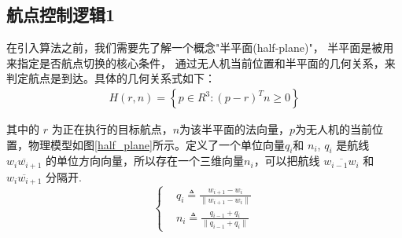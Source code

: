 \subsection{航点控制逻辑1}
在引入算法之前，我们需要先了解一个概念"半平面(half-plane)"，
半平面是被用来指定是否航点切换的核心条件，
通过无人机当前位置和半平面的几何关系，来判定航点是到达。具体的几何关系式如下：
    \begin{equation} %
        \begin{aligned}
            \textit{H}(r,n) = \left\{ p \in R^{3} : \left(p-r\right)^{T}n \geq 0 \right\} 
        \end{aligned}
    \end{equation}
    \par 其中的 $r$ 为正在执行的目标航点，$n$为该半平面的法向量，$p$为无人机的当前位置，物理模型如图\ref{half_plane}所示。定义了一个单位向量$q_{i}$和 $n_{i}$,
    $q_{i}$ 是航线 $\overline{w_{i}w_{i+1}}$ 的单位方向向量，所以存在一个三维向量$n_{i}$，可以把航线 $\overline{w_{i-1}w_{i}}$ 和 $\overline{w_{i}w_{i+1}}$ 分隔开.
    \begin{equation}
        \begin{cases}
        &q_{i} \triangleq \frac{w_{i+1}-w_{i}}{\lVert w_{i+1}-w_{i} \rVert} \\
        &n_{i} \triangleq \frac{q_{i-1}+q_{i}}{\lVert q_{i-1}+q_{i} \rVert}
        \end{cases}
    \end{equation}
